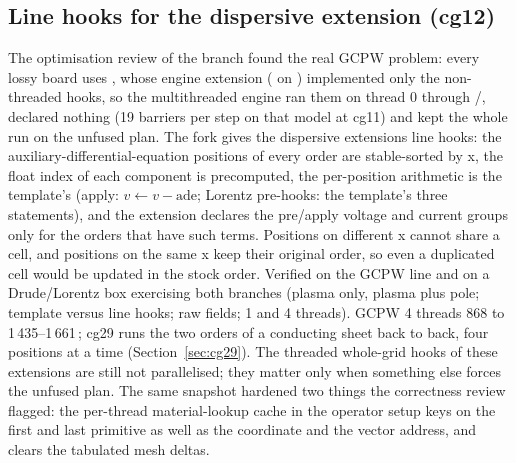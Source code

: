 \subsection{Line hooks for the dispersive extension (cg12)}
The optimisation review of the branch found the real GCPW problem: every lossy board uses ,
whose engine extension ( on ) implemented only the
non-threaded hooks, so the multithreaded engine ran them on thread 0 through /, declared
nothing (19 barriers per step on that model at cg11) and kept the whole run on the unfused plan. The fork gives the
dispersive extensions line hooks: the auxiliary-differential-equation positions of every order are stable-sorted by
x, the float index of each component is precomputed, the per-position arithmetic is the template's (apply:
$v \leftarrow v - \text{ade}$; Lorentz pre-hooks: the template's three statements), and the extension declares the
pre/apply voltage and current groups only for the orders that have such terms. Positions on different x cannot share
a cell, and positions on the same x keep their original order, so even a duplicated cell would be updated in the
stock order. Verified on the GCPW line and on a Drude/Lorentz box exercising both branches (plasma only, plasma plus
pole; template versus line hooks; raw fields; 1 and 4 threads). GCPW 4 threads 868 to 1\,435--1\,661\,\MC; cg29 runs
the two orders of a conducting sheet back to back, four positions at a time (Section~\ref{sec:cg29}). The threaded
whole-grid hooks of these extensions are still not parallelised; they matter only when something else forces the
unfused plan. The same snapshot hardened two things the correctness review flagged: the per-thread material-lookup
cache in the operator setup keys on the first and last primitive as well as the coordinate and the vector address,
and  clears the tabulated mesh deltas.

